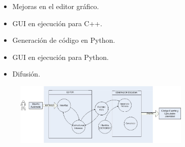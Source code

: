 \documentclass[notes,slidesec,a4]{seminar}
\begin{document}

\begin{hslide}


\begin{itemize}
\item Mejoras en el editor gráfico.
\item GUI en ejecución para C++.
\item Generación de código en Python.
\item GUI en ejecución para Python.
\item Difusión.
\end{itemize}
\begin{center}
	\begin{figure}
		\includegraphics[height=3cm]{imgs/cajaBlanca.jpg}
	\end{figure}
\end{center}

\end{hslide}

\end{document}
